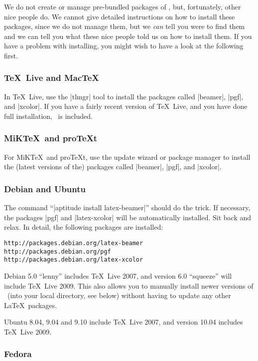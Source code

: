 We do not create or manage pre-bundled packages of \beamer, but, fortunately, other nice people do. We cannot give detailed instructions on how to install these packages, since we do not manage them, but we \emph{can} tell you were to find them and we can tell you what these nice people told us on how to install them. If you have a problem with installing, you might wish to have a look at the following first.


\subsubsection{\TeX\ Live and Mac\TeX}

In \TeX\ Live, use the |tlmgr| tool to install the packages called |beamer|, |pgf|, and |xcolor|. If you have a fairly recent version of \TeX\ Live, and you have done full installation, \beamer\ is included.


\subsubsection{MiK\TeX\ and pro\TeX t}

For MiK\TeX\ and pro\TeX t, use the update wizard or package manager to install the (latest versions of the) packages called |beamer|, |pgf|, and |xcolor|.


\subsubsection{Debian and Ubuntu}

The command ``|aptitude install latex-beamer|'' should do the trick. If necessary, the packages |pgf| and |latex-xcolor| will be automatically installed. Sit back and relax. In detail, the following packages are installed:
\begin{verbatim}
http://packages.debian.org/latex-beamer
http://packages.debian.org/pgf
http://packages.debian.org/latex-xcolor
\end{verbatim}

Debian 5.0 ``lenny'' includes \TeX\ Live 2007, and version 6.0 ``squeeze'' will include \TeX\ Live 2009. This also allows you to manually install newer versions of \beamer\ (into your local directory, see below) without having to update any other \LaTeX\ packages.

Ubuntu 8.04, 9.04 and 9.10 include \TeX\ Live 2007, and version 10.04 includes \TeX\ Live 2009.


\subsubsection{Fedora}

